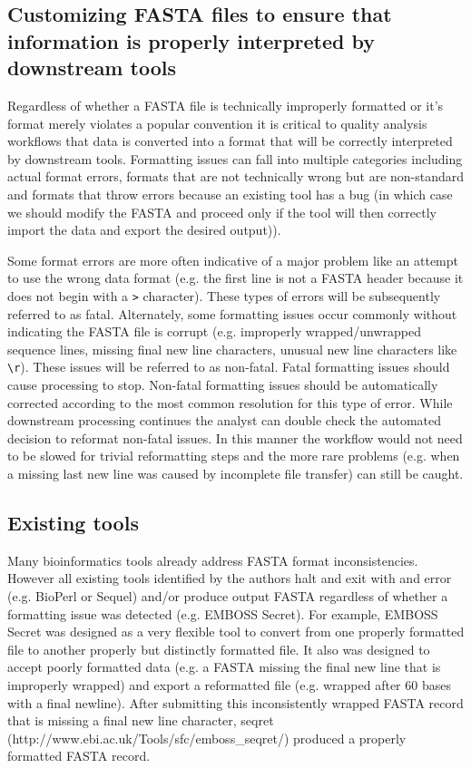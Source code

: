 \subsection{Customizing FASTA files to ensure that information is properly interpreted by downstream tools}

Regardless of whether a FASTA file is technically improperly formatted or it's format merely violates a popular convention it is critical to quality analysis workflows that data is converted into a format that will be correctly interpreted by downstream tools. Formatting issues can fall into multiple categories including actual format errors, formats that are not technically wrong but are non-standard and formats that throw errors because an existing tool has a bug (in which case we should modify the FASTA and proceed only if the tool will then correctly import the data and export the desired output)). 

Some format errors are more often indicative of a major problem like an attempt to use the wrong data format (e.g. the first line is not a FASTA header because it does not begin with a \verb|>| character). These types of errors will be subsequently referred to as fatal. Alternately, some formatting issues occur commonly without indicating the FASTA file is corrupt (e.g. improperly wrapped/unwrapped sequence lines, missing final new line characters, unusual new line characters like \verb|\r|). These issues will be referred to as non-fatal. Fatal formatting issues should cause processing to stop. Non-fatal formatting issues should be automatically corrected according to the most common resolution for this type of error. While downstream processing continues the analyst can double check the automated decision to reformat non-fatal issues. In this manner the workflow would not need to be slowed for trivial reformatting steps and the more rare problems (e.g. when a missing last new line was caused by incomplete file transfer) can still be caught.
  
\subsection{Existing tools}

Many bioinformatics tools already address FASTA format inconsistencies. However all existing tools identified by the authors halt and exit with and error (e.g. BioPerl or Sequel) and/or produce output FASTA regardless of whether a formatting issue was detected (e.g. EMBOSS Secret). For example, EMBOSS Secret was designed as a very flexible tool to convert from one properly formatted file to another properly but distinctly formatted file. It also was designed to accept poorly formatted data (e.g. a FASTA missing the final new line that is improperly wrapped) and export a reformatted file (e.g. wrapped after 60 bases with a final newline). After submitting this inconsistently wrapped FASTA record that is missing a final new line character, seqret (http://www.ebi.ac.uk/Tools/sfc/emboss_seqret/) produced a properly formatted FASTA record.

